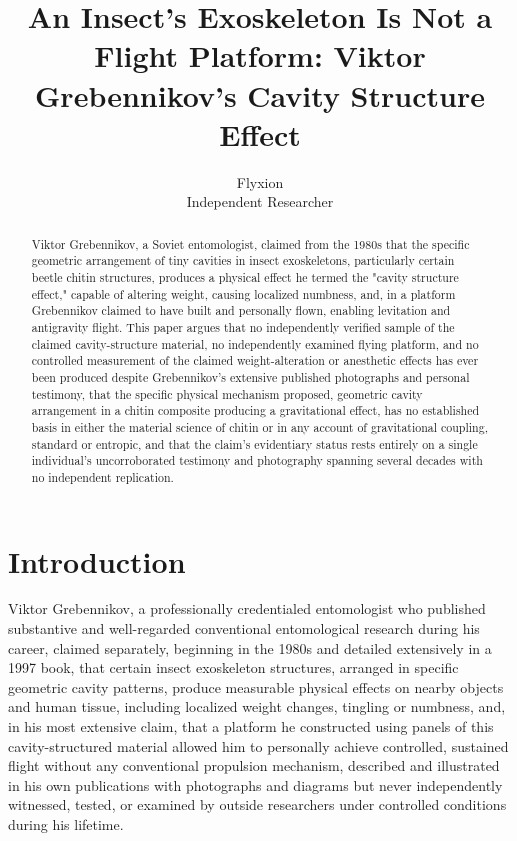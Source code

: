 \documentclass[11pt]{article}
\title{An Insect's Exoskeleton Is Not a Flight Platform: Viktor Grebennikov's Cavity Structure Effect}
\author{Flyxion \\ \small Independent Researcher}
\date{}
\begin{document}
\maketitle

\begin{abstract}
Viktor Grebennikov, a Soviet entomologist, claimed from the 1980s that the specific geometric arrangement of tiny cavities in insect exoskeletons, particularly certain beetle chitin structures, produces a physical effect he termed the "cavity structure effect," capable of altering weight, causing localized numbness, and, in a platform Grebennikov claimed to have built and personally flown, enabling levitation and antigravity flight. This paper argues that no independently verified sample of the claimed cavity-structure material, no independently examined flying platform, and no controlled measurement of the claimed weight-alteration or anesthetic effects has ever been produced despite Grebennikov's extensive published photographs and personal testimony, that the specific physical mechanism proposed, geometric cavity arrangement in a chitin composite producing a gravitational effect, has no established basis in either the material science of chitin or in any account of gravitational coupling, standard or entropic, and that the claim's evidentiary status rests entirely on a single individual's uncorroborated testimony and photography spanning several decades with no independent replication.
\end{abstract}

\section{Introduction}

Viktor Grebennikov, a professionally credentialed entomologist who published substantive and well-regarded conventional entomological research during his career, claimed separately, beginning in the 1980s and detailed extensively in a 1997 book, that certain insect exoskeleton structures, arranged in specific geometric cavity patterns, produce measurable physical effects on nearby objects and human tissue, including localized weight changes, tingling or numbness, and, in his most extensive claim, that a platform he constructed using panels of this cavity-structured material allowed him to personally achieve controlled, sustained flight without any conventional propulsion mechanism, described and illustrated in his own publications with photographs and diagrams but never independently witnessed, tested, or examined by outside researchers under controlled conditions during his lifetime.
\end{document}
